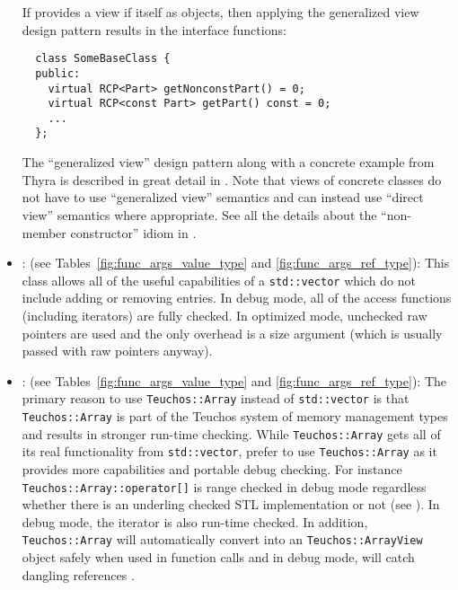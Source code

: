 \begin{itemize}
If {} provides a view if itself as {}
objects, then applying the generalized view design pattern results in
the interface functions:

{\small\begin{verbatim}
  class SomeBaseClass {
  public:
    virtual RCP<Part> getNonconstPart() = 0;
    virtual RCP<const Part> getPart() const = 0;
    ...
  };
\end{verbatim}}

The ``generalized view'' design pattern along with a concrete example
from Thyra is described in great detail in
{}\cite{TeuchosMemoryManagementGuide}.  Note that views of concrete
classes do not have to use ``generalized view'' semantics and can
instead use ``direct view'' semantics where appropriate.  See all the
details about the ``non-member constructor'' idiom in
{}\cite{TeuchosMemoryManagementGuide}.


{}\item\GCGTeuchosArrayView: (see Tables~\ref{fig:func_args_value_type} and
{}\ref{fig:func_args_ref_type}): This class allows all of the useful
capabilities of a {}\texttt{std::vector} which do not include adding or
removing entries.  In debug mode, all of the access functions (including
iterators) are fully checked.  In optimized mode, unchecked raw pointers are
used and the only overhead is a size argument (which is usually passed with
raw pointers anyway).


{}\item\GCGTeuchosArray: (see Tables~\ref{fig:func_args_value_type}
and {}\ref{fig:func_args_ref_type}): The primary reason to use
{}\texttt{Teuchos::\-Array} instead of {}\texttt{std::\-vector} is
that {}\texttt{Teuchos::\-Array} is part of the Teuchos system of
memory management types and results in stronger run-time checking.
While {}\texttt{Teuchos::\-Array} gets all of its real functionality
from {}\texttt{std::\-vector}, prefer to use
{}\texttt{Teuchos::\-Array} as it provides more capabilities and
portable debug checking.  For instance
{}\texttt{Teuchos::\-Array::\-operator[]} is range checked in debug
mode regardless whether there is an underling checked STL
implementation or not (see {}\cite[Item 83]{C++CodingStandards05}).
In debug mode, the iterator is also run-time checked.  In addition,
{}\texttt{Teuchos\-::Array} will automatically convert into an
{}\texttt{Teuchos\-::ArrayView} object safely when used in function
calls and in debug mode, will catch dangling references
{}\cite{TeuchosMemoryManagementGuide}.



\end{itemize}
